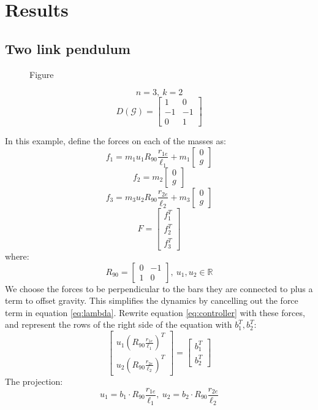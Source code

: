 \documentclass[conference]{article} %
\begin{document}
\section{Results}
\subsection{Two link pendulum}
\begin{figure}[htbp]
    \centering
    \caption{Figure}
    \label{fig:overp}
\end{figure}
$$n=3,\:k=2$$
$$D(\mathcal{G})=\begin{bmatrix}
    1 & 0\\
    -1 & -1\\
    0 & 1
\end{bmatrix}$$

In this example, define the forces on each of the masses as:
$$f_1=m_1u_1R_{90}\frac{r_{1e}}{\ell_1} + m_1\begin{bmatrix} 0\\ g \end{bmatrix}$$
$$f_2=m_2\begin{bmatrix} 0\\ g \end{bmatrix}$$
$$f_3=m_3u_2R_{90}\frac{r_{2e}}{\ell_2} + m_3\begin{bmatrix} 0\\ g \end{bmatrix}$$
$$F=\begin{bmatrix}
    f_1^T\\ f_2^T\\ f_3^T
\end{bmatrix}$$
where:
$$R_{90}=\begin{bmatrix}
    0 & -1\\ 1 & 0
\end{bmatrix},\:u_1,u_2\in\mathbb{R}$$
We choose the forces to be perpendicular to the bars they are connected to plus a term to offset gravity. This simplifies the dynamics by cancelling out the force term in equation \ref{eq:lambda}. Rewrite equation \ref{eq:controller} with these forces, and represent the rows of the right side of the equation with $b_1^T,b_2^T$:
$$\begin{bmatrix}
    u_1(R_{90}\frac{r_{1e}}{\ell_1})^T\\
    u_2(R_{90}\frac{r_{2e}}{\ell_2})^T
\end{bmatrix}=\begin{bmatrix}
    b_1^T\\ b_2^T
\end{bmatrix}$$
The projection:
$$u_1=b_1\cdot R_{90}\frac{r_{1e}}{\ell_1},\:u_2=b_2\cdot R_{90}\frac{r_{2e}}{\ell_2}$$
\end{document}
